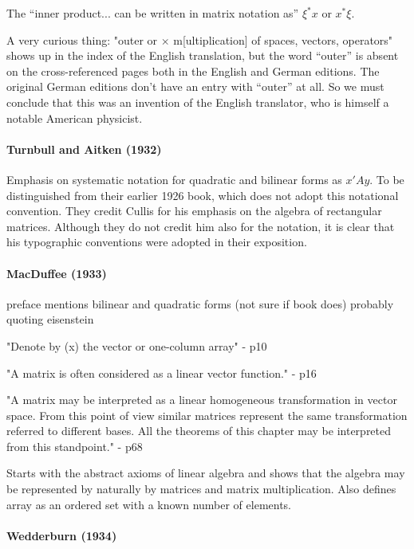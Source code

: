 The ``inner product... can be written in matrix notation as''
$\xi^*x$ or $x^*\xi$.

A very curious thing: "outer or $\times$ m[ultiplication] of spaces, vectors, operators" shows up in the index of the English translation, but the word ``outer'' is absent on the cross-referenced pages both in the English and German editions. The original German editions don't have an entry with ``outer'' at all. So we must conclude that this was an invention of the English translator, who is himself a notable American physicist.


\paragraph{Turnbull and Aitken (1932)}

Emphasis on systematic notation for quadratic and bilinear forms as $x'Ay$.
To be distinguished from their earlier 1926 book, which does not adopt this notational convention.
They credit Cullis for his emphasis on the algebra of rectangular matrices. Although they do not credit him also for the notation, it is clear that his typographic conventions were adopted in their exposition.



\paragraph{MacDuffee (1933)~\cite{MacDuffee1933}}

preface mentions bilinear and quadratic forms (not sure if book does)
probably quoting eisenstein

"Denote by (x) the vector or one-column array" - p10

"A matrix is often considered as a linear vector function." - p16

"A matrix may be interpreted as a linear homogeneous transformation in
vector space. From this point of view similar matrices represent the
same transformation referred to different bases. All the theorems of
this chapter may be interpreted from this standpoint." - p68

Starts with the abstract axioms of linear algebra and shows that the algebra may be represented by naturally by matrices and matrix multiplication. Also defines array as an ordered set with a known number of elements.

\paragraph{Wedderburn (1934)~\cite{Wedderburn1934}}

